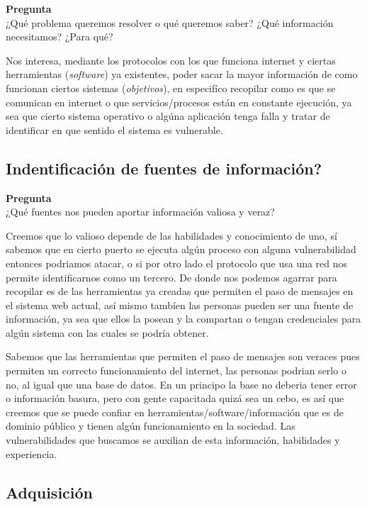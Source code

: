 \documentclass{article}
\newenvironment{problem}[2][Pregunta]
    { \begin{mdframed}[backgroundcolor=gray!20] \textbf{#1 #2} \\}
    {  \end{mdframed}}
\begin{document}
\begin{problem}
  {} ¿Qué problema queremos resolver o qué queremos saber? ¿Qué información
necesitamos? ¿Para qué?
\end{problem}

Nos interesa, mediante los protocolos con los que funciona internet y ciertas
herramientas ({\it software})
ya existentes, poder sacar la mayor información de como funcionan ciertos sistemas ({\it objetivos}), en especifíco recopilar como es que se comunican en internet o que servicios/procesos están
en constante ejecución, ya sea que cierto sistema operativo o algúna aplicación tenga falla
y tratar de identificar en que sentido el sistema es vulnerable.

\subsection{Indentificación de fuentes de información?}

\begin{problem}
  {} ¿Qué fuentes nos pueden aportar información
  valiosa y veraz?  
\end{problem}

Creemos que lo valioso depende de las habilidades y conocimiento de uno, sí sabemos
que en cierto puerto se ejecuta algún proceso con alguna vulnerabilidad entonces podriamos
atacar, o si por otro lado el protocolo que usa una red nos permite identificarnos como
un tercero. De donde nos podemos agarrar para recopilar es de las herramientas
ya creadas que permiten el paso de mensajes en el sistema web actual, así mismo tambíen las
personas pueden ser una fuente de información, ya sea que ellos la posean y la compartan o
tengan credenciales para algún sistema con las cuales se podría obtener.

Sabemos que las herramientas que permiten el paso de mensajes son veraces pues permiten un
correcto funcionamiento del internet, las personas podrian serlo o no, al igual que una
base de datos. En un principo la base no deberia tener error o información basura, pero con
gente capacitada quizá sea un cebo, es así que creemos que se puede confiar
en herramientas/software/información que es de dominio público y tienen algún funcionamiento
en la sociedad. Las vulnerabilidades que buscamos se auxilian de esta información, habilidades
y experiencia.

\subsection{Adquisición}
\end{document}
